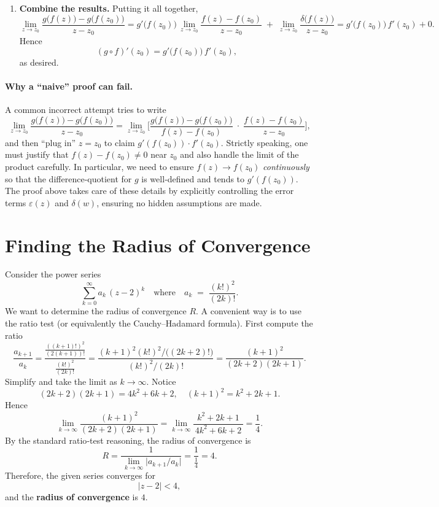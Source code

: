 \documentclass[12pt]{article}
\theoremstyle{definition} %
\theoremstyle{plain} %
\begin{document}
\begin{enumerate}
\item \textbf{Combine the results.}
Putting it all together,
\[
\lim_{z \to z_0}
\frac{g\bigl(f(z)\bigr) - g\bigl(f(z_0)\bigr)}{\,z - z_0\,}
=
g'\bigl(f(z_0)\bigr)\,\lim_{z \to z_0}\frac{f(z) - f(z_0)}{\,z - z_0\,}
\;+\;
\lim_{z \to z_0} \frac{\delta\bigl(f(z)\bigr)}{\,z - z_0\,}
=
g'\bigl(f(z_0)\bigr)\,f'(z_0) + 0.
\]
Hence
\[
(g \circ f)'(z_0) 
= g'\bigl(f(z_0)\bigr)\,f'(z_0),
\]
as desired.
\end{enumerate}

\paragraph{Why a ``naive'' proof can fail.}
A common incorrect attempt tries to write 
\[
\lim_{z \to z_0}
\frac{g\bigl(f(z)\bigr) - g\bigl(f(z_0)\bigr)}{\,z - z_0\,}
=
\lim_{z \to z_0} 
\biggl[
\frac{g\bigl(f(z)\bigr) - g\bigl(f(z_0)\bigr)}{\,f(z) - f(z_0)\,}
\;\cdot\;
\frac{f(z) - f(z_0)}{\,z - z_0\,}
\biggr],
\]
and then ``plug in'' $z=z_0$ to claim
\(
g'(f(z_0)) \cdot f'(z_0).
\)
Strictly speaking, one must justify that $f(z) - f(z_0)\neq 0$ near $z_0$ and also handle the limit of the product carefully.  In particular, we need to ensure $f(z)\to f(z_0)$ \emph{continuously} so that the difference‐quotient for $g$ is well‐defined and tends to $g'(f(z_0))$.  The proof above takes care of these details by explicitly controlling the error terms $\varepsilon(z)$ and $\delta(w)$, ensuring no hidden assumptions are made.

\section*{Finding the Radius of Convergence}

Consider the power series
\[
\sum_{k=0}^{\infty} a_k \,(z-2)^k
\quad\text{where}\quad
a_k \;=\; \frac{(k!)^2}{(2k)!}.
\]
We want to determine the radius of convergence $R$.  A convenient way is to use the ratio test (or equivalently the Cauchy--Hadamard formula).  First compute the ratio
\[
\frac{a_{k+1}}{a_k}
=
\frac{\tfrac{((k+1)!)^2}{(2(k+1))!}}{\tfrac{(k!)^2}{(2k)!}}
=
\frac{(k+1)^2 (k!)^2 / \bigl((2k+2)!\bigr)}
     {(k!)^2 / (2k)!}
=
\frac{(k+1)^2}{(2k+2)(2k+1)}.
\]
Simplify and take the limit as $k\to\infty$.  Notice
\[
(2k+2)(2k+1) = 4k^2 + 6k + 2,
\quad
(k+1)^2 = k^2 + 2k + 1.
\]
Hence
\[
\lim_{k\to\infty}
\frac{(k+1)^2}{(2k+2)(2k+1)}
=
\lim_{k\to\infty}
\frac{k^2 + 2k + 1}{\,4k^2 + 6k + 2\,}
= \frac{1}{4}.
\]
By the standard ratio‐test reasoning, the radius of convergence is
\[
R
= \frac{1}{\,\lim_{k\to\infty} \bigl|a_{k+1}/a_k\bigr|}
= \frac{1}{\tfrac{1}{4}}
= 4.
\]
Therefore, the given series converges for
\[
|z-2| < 4,
\]
and the \textbf{radius of convergence} is $\boxed{4}$.
\end{document}
